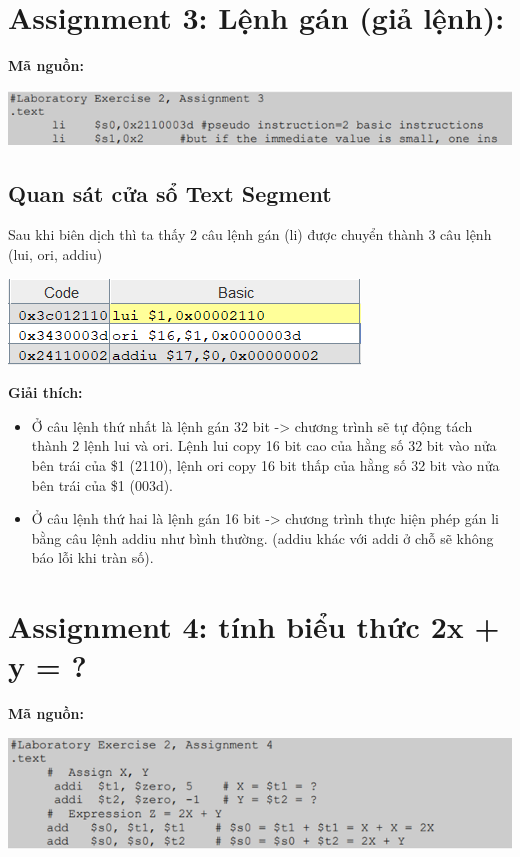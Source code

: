 \documentclass[12pt,a4paper,oneside]{article}
\begin{document}
\section{Assignment 3: Lệnh gán (giả lệnh):}
	\textbf{Mã nguồn:}
		\begin{center}
		\includegraphics[scale=1]{image/8}
		\end{center}
	\subsection{Quan sát cửa sổ Text Segment}
		Sau khi biên dịch thì ta thấy 2 câu lệnh gán (li) được chuyển thành 3 câu lệnh (lui, ori, addiu)
		\begin{center}
		\includegraphics[scale=1]{image/9}
		\end{center}
		\textbf{Giải thích:}
			\begin{itemize}
			\item Ở câu lệnh thứ nhất là lệnh gán 32 bit -> chương trình sẽ tự động tách thành 2 lệnh lui và ori. Lệnh lui copy 16 bit cao của hằng số 32 bit vào nửa bên trái của \$1 (2110), lệnh ori copy 16 bit thấp của hằng số 32 bit vào nửa bên trái của \$1 (003d).
			\item Ở câu lệnh thứ hai là lệnh gán 16 bit -> chương trình thực hiện phép gán li bằng câu lệnh addiu như bình thường. (addiu khác với addi ở chỗ sẽ không báo lỗi khi tràn số).
			\end{itemize}
\pagebreak
\section{Assignment 4: tính biểu thức 2x + y = ?}
	\textbf{Mã nguồn:}
		\begin{center}
		\includegraphics[scale=1]{image/10}
		\end{center}
\end{document}
